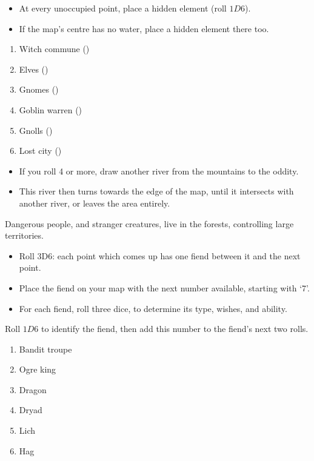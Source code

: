 \begin{multicols}{2}

\begin{itemize}
  \item
  At every unoccupied point, place a hidden element (roll $1D6$).
  \item
  If the map's centre has no water, place a hidden element there too.
\end{itemize}

\begin{multicols}{2}
\begin{enumerate}\raggedright
\item
  Witch commune (\Hu)
\item
  Elves (\El)
\item
  Gnomes (\Gn)
\item
  Goblin warren (\N)
\item
  Gnolls (\Nl)
\item
  Lost city ()
\end{enumerate}
\end{multicols}

\begin{itemize}
  \item
  If you roll 4 or more, draw another river from the mountains to the oddity.
  \item
  This river then turns towards the edge of the map, until it intersects with another river, or leaves the area entirely.
\end{itemize}


Dangerous people, and stranger creatures, live in the forests, controlling large territories.

\begin{itemize}
\item
  Roll 3D6: each point which comes up has one fiend between it and the
  next point.
\item
  Place the fiend on your map with the next number available, starting
  with `7'.
\item
  For each fiend, roll three dice, to determine its type, wishes, and
  ability.
\end{itemize}


Roll $1D6$ to identify the fiend, then add this number to the fiend's next two rolls.

\begin{multicols}{2}
\begin{enumerate}
\item
  Bandit troupe
\item
  Ogre king
\item
  Dragon
\item
  Dryad
\item
  Lich
\item
  Hag
\end{enumerate}
\end{multicols}


\end{multicols}
